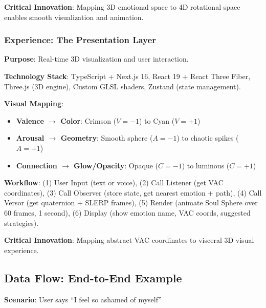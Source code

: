 \textbf{Critical Innovation}: Mapping 3D emotional space to 4D rotational space enables smooth visualization and animation.

\subsubsection{Experience: The Presentation Layer}

\textbf{Purpose}: Real-time 3D visualization and user interaction.

\textbf{Technology Stack}: TypeScript + Next.js 16, React 19 + React Three Fiber, Three.js (3D engine), Custom GLSL shaders, Zustand (state management).

\textbf{Visual Mapping}:
\begin{itemize}
    \item \textbf{Valence $\rightarrow$ Color}: Crimson ($V = -1$) to Cyan ($V = +1$)
    \item \textbf{Arousal $\rightarrow$ Geometry}: Smooth sphere ($A = -1$) to chaotic spikes ($A = +1$)
    \item \textbf{Connection $\rightarrow$ Glow/Opacity}: Opaque ($C = -1$) to luminous ($C = +1$)
\end{itemize}

\textbf{Workflow}: (1) User Input (text or voice), (2) Call Listener (get VAC coordinates), (3) Call Observer (store state, get nearest emotion + path), (4) Call Versor (get quaternion + SLERP frames), (5) Render (animate Soul Sphere over 60 frames, 1 second), (6) Display (show emotion name, VAC coords, suggested strategies).

\textbf{Critical Innovation}: Mapping abstract VAC coordinates to visceral 3D visual experience.

\subsection{Data Flow: End-to-End Example}

\textbf{Scenario}: User says ``I feel so ashamed of myself''

